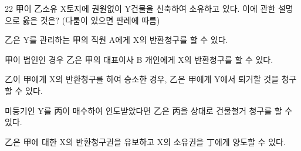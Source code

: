 \begin{question}{22}
甲이 乙소유 X토지에 권원없이 Y건물을 신축하여 소유하고 있다. 이에 관한 설명으로 옳은 것은? (다툼이 있으면 판례에 따름)
\begin{choices}
  \item 乙은 Y를 관리하는 甲의 직원 A에게 X의 반환청구를 할 수 있다.
  \item 甲이 법인인 경우 乙은 甲의 대표이사 B 개인에게 X의 반환청구를 할 수 있다.
  \item 乙이 甲에게 X의 반환청구를 하여 승소한 경우, 乙은 甲에게 Y에서 퇴거할 것을 청구할 수 있다.
  \item 미등기인 Y를 丙이 매수하여 인도받았다면 乙은 丙을 상대로 건물철거 청구를 할 수 있다.
  \item 乙은 甲에 대한 X의 반환청구권을 유보하고 X의 소유권을 丁에게 양도할 수 있다.
\end{choices}
\end{question}

